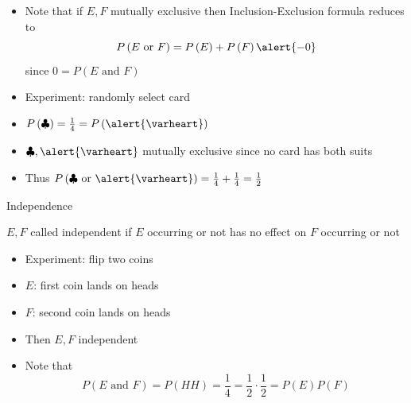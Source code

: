 \documentclass[handout]{beamer}
\theoremstyle{definition}
\begin{document}
\begin{frame}
\begin{itemize}
\item Note that if $E,F$ mutually exclusive then Inclusion-Exclusion
formula reduces to
\[P\left(\text{$E$ or $F$}\right)=P\left(E\right)
+P\left(F\right)\alert{-0}\]
since $0=P\left(\text{$E$ and $F$}\right)$
\end{itemize}
\begin{example}
\begin{itemize}
\item Experiment: randomly select card
\item $P\left(\clubsuit\right)=\frac{1}{4}=P\left(\alert{\varheart}\right)$
\item $\clubsuit,\alert{\varheart}$ mutually exclusive
since no card has \alert{both} suits
\item Thus $P\left(\text{$\clubsuit$ or $\alert{\varheart}$}\right)
=\frac{1}{4}+\frac{1}{4}=\frac{1}{2}$
\end{itemize}
\end{example}
\end{frame}

\begin{frame}{Independence}
\begin{definition}
$E,F$ called \alert{independent} if $E$
occurring or not has no effect on $F$ occurring or not
\end{definition}
\begin{example}
\begin{itemize}
\item Experiment: flip two coins
\item $E$: first coin lands on heads
\item $F$: second coin lands on heads
\item Then $E,F$ independent
\item Note that 
\[P\left(\text{$E$ and $F$}\right)=P\left(HH\right)
=\frac{1}{4}
=\frac{1}{2}\cdot\frac{1}{2}=P\left(E\right)P\left(F\right)\]
\end{itemize}
\end{example}
\end{frame}
\end{document}
